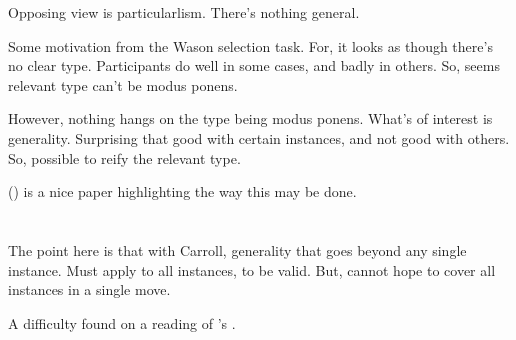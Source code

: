 \begin{note}
  Opposing view is particularlism.
  There's nothing general.

  Some motivation from the Wason selection task.
  For, it looks as though there's no clear type.
  Participants do well in some cases, and badly in others.
  So, seems relevant type can't be modus ponens.

  However, nothing hangs on the type being modus ponens.
  What's of interest is generality.
  Surprising that good with certain instances, and not good with others.
  So, possible to reify the relevant type.

  (\cite{Fodor:2000aa}) is a nice paper highlighting the way this may be done.
\end{note}

\section{\citeauthor{Carroll:1895uj}}

\nocite{Black:1951aa}

\begin{note}
  The point here is that with Carroll, generality that goes beyond any single instance.
  Must apply to all instances, to be valid.
  But, cannot hope to cover all instances in a single move.
\end{note}

\begin{note}
  A difficulty found on a reading of \citeauthor{Carroll:1895uj}'s .
\end{note}

